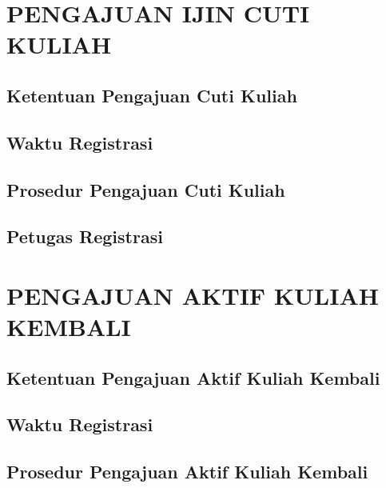 \documentclass[
]{book}
\begin{document}
\hypertarget{pengajuan-ijin-cuti-kuliah}{%
\chapter{PENGAJUAN IJIN CUTI KULIAH}\label{pengajuan-ijin-cuti-kuliah}}

\hypertarget{ketentuan-pengajuan-cuti-kuliah}{%
\section{Ketentuan Pengajuan Cuti Kuliah}\label{ketentuan-pengajuan-cuti-kuliah}}

\hypertarget{waktu-registrasi}{%
\section{Waktu Registrasi}\label{waktu-registrasi}}

\hypertarget{prosedur-pengajuan-cuti-kuliah}{%
\section{Prosedur Pengajuan Cuti Kuliah}\label{prosedur-pengajuan-cuti-kuliah}}

\hypertarget{petugas-registrasi}{%
\section{Petugas Registrasi}\label{petugas-registrasi}}

\hypertarget{pengajuan-aktif-kuliah-kembali}{%
\chapter{PENGAJUAN AKTIF KULIAH KEMBALI}\label{pengajuan-aktif-kuliah-kembali}}

\hypertarget{ketentuan-pengajuan-aktif-kuliah-kembali}{%
\section{Ketentuan Pengajuan Aktif Kuliah Kembali}\label{ketentuan-pengajuan-aktif-kuliah-kembali}}

\hypertarget{waktu-registrasi}{%
\section{Waktu Registrasi}\label{waktu-registrasi}}

\hypertarget{prosedur-pengajuan-aktif-kuliah-kembali}{%
\section{Prosedur Pengajuan Aktif Kuliah Kembali}\label{prosedur-pengajuan-aktif-kuliah-kembali}}
\end{document}
